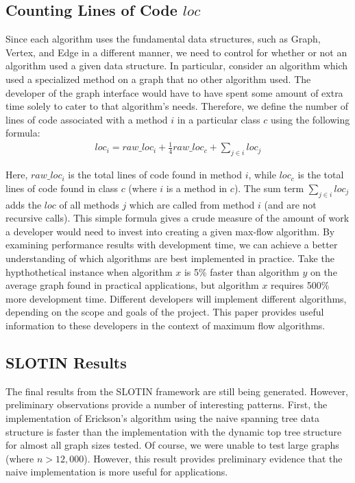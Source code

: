 \documentclass[12pt]{article}
\begin{document}
\subsection{Counting Lines of Code $loc$}

Since each algorithm uses the fundamental data structures, such as Graph, Vertex, and Edge in a different manner, we need to control for whether or not an algorithm used a given data structure. In particular, consider an algorithm which used a specialized method on a graph that no other algorithm used. The developer of the graph interface would have to have spent some amount of extra time solely to cater to that algorithm's needs. Therefore, we define the number of lines of code associated with a method $i$ in a particular class $c$ using the following formula:
\begin{eqnarray}
loc_{i} = raw\_loc_{i} + \frac{1}{4} raw\_loc_{c} + \sum_{j \in i} loc_{j} 
\end{eqnarray}

Here, $raw\_loc_i$ is the total lines of code found in method $i$, while $loc_c$ is the total lines of code found in class $c$ (where $i$ is a method in $c$). The sum term $\sum_{j \in i} loc_j$ adds the $loc$ of all methods $j$ which are called from method $i$ (and are not recursive calls). This simple formula gives a crude measure of the amount of work a developer would need to invest into creating a given max-flow algorithm. By examining performance results with development time, we can achieve a better understanding of which algorithms are best implemented in practice. Take the hypthothetical instance when algorithm $x$ is 5\% faster than algorithm $y$ on the average graph found in practical applications, but algorithm $x$ requires 500\% more development time. Different developers will implement different algorithms, depending on the scope and goals of the project. This paper provides useful information to these developers in the context of maximum flow algorithms.

\subsection{SLOTIN Results}

The final results from the SLOTIN framework are still being generated. However, preliminary observations provide a number of interesting patterns. First, the implementation of Erickson's algorithm using the naive spanning tree data structure is faster than the implementation with the dynamic top tree structure for almost all graph sizes tested. Of course, we were unable to test large graphs (where $n > 12,000$). However, this result provides preliminary evidence that the naive implementation is more useful for applications. 
\end{document}
